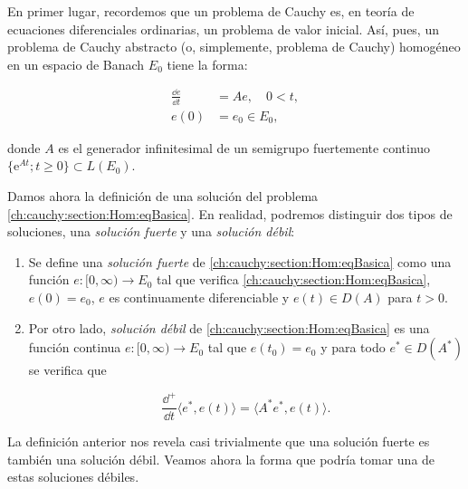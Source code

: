 En primer lugar, recordemos que un problema de Cauchy es, en teoría de ecuaciones diferenciales ordinarias, un problema de valor inicial. Así, pues, un problema de Cauchy abstracto (o, simplemente, problema de Cauchy) homogéneo en un espacio de Banach $E_0$ tiene la forma:

\begin{equation}
    \label{ch:cauchy:section:Hom:eqBasica}
    \begin{aligned}
        \frac{\dd e}{\dd t} &= Ae, \quad 0 < t,\\
        e(0) &= e_0 \in E_0,
    \end{aligned}
\end{equation}

donde $A$ es el generador infinitesimal de un semigrupo fuertemente continuo $\{\mathrm{e}^{At} ; t \geq 0\} \subset L(E_0)$.

Damos ahora la definición de una solución del problema \eqref{ch:cauchy:section:Hom:eqBasica}. En realidad, podremos distinguir dos tipos de soluciones, una \textit{solución fuerte} y una \textit{solución débil}:\\

\begin{Definicion}
    \label{ch:cauchy:section:Hom:def:soluciones}

    \begin{enumerate}[label=\alph*)]
        \item Se define una \textit{solución fuerte} de \eqref{ch:cauchy:section:Hom:eqBasica} como una función $e : [0,\infty) \rightarrow E_0$ tal que verifica \eqref{ch:cauchy:section:Hom:eqBasica}, $e(0) = e_0$, $e$ es continuamente diferenciable y $e(t) \in D(A)$ para $t > 0$.

        \item Por otro lado, \textit{solución débil} de \eqref{ch:cauchy:section:Hom:eqBasica} es una función continua $e : [0,\infty) \rightarrow E_0$ tal que $e(t_0) = e_0$ y para todo $e^* \in D(A^*)$ se verifica que

        \[\frac{\dd^+}{\dd t}\langle e^*, e(t) \rangle = \langle A^*e^*, e(t)\rangle.\]
    \end{enumerate}
\end{Definicion}

La definición anterior nos revela casi trivialmente que una solución fuerte es también una solución débil. Veamos ahora la forma que podría tomar una de estas soluciones débiles.

